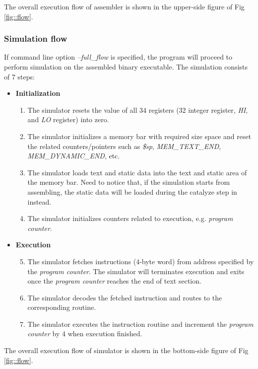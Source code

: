 \documentclass[conference, draftclsnofoot, letterpaper]{IEEETran}
\begin{document}
The overall execution flow of assembler is shown in the upper-side figure of Fig \ref{fig::flow}.

\subsubsection{Simulation flow}

If command line option \emph{--full\_flow} is specified, the program will proceed to perform simulation on the assembled binary executable. The simulation consists of 7 steps:

\begin{itemize}
	\item \textbf{Initialization}
	\begin{enumerate}[label=(\roman*)]\itemsep .5em
		\item The simulator resets the value of all 34 registers (32 integer register, \emph{HI}, and \emph{LO} register) into zero.
		\item The simulator initializes a memory bar with required size space and reset the related counters/pointers such as \emph{\$sp}, \emph{MEM\_TEXT\_END}, \emph{MEM\_DYNAMIC\_END}, etc.
		\item The simulator loads text and static data into the text and static area of the memory bar. Need to notice that, if the simulation starts from assembling, the static data will be loaded during the catalyze step in instead. 
		\item The simulator initializes counters related to execution, e.g. \emph{program counter}.
	\end{enumerate}
	\item \textbf{Execution}
	\begin{enumerate}[label=(\roman*)\itemsep .5em]
		\setcounter{enumi}{4}
		\item The simulator fetches instructions (4-byte word) from address specified by the \emph{program counter}. The simulator will terminates execution and exits once the \emph{program counter} reaches the end of text section. 
		\item The simulator decodes the fetched instruction and routes to the corresponding routine.
		\item The simulator executes the instruction routine and increment the \emph{program counter} by 4 when execution finished.
	\end{enumerate}
\end{itemize}

The overall execution flow of simulator is shown in the bottom-side figure of Fig \ref{fig::flow}.
\end{document}
